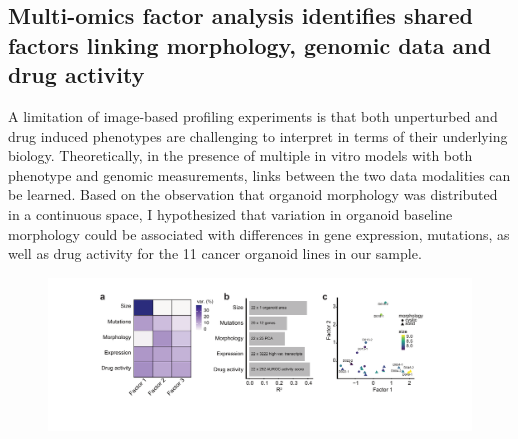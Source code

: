 \begin{flushleft}
\section{Multi-omics factor analysis identifies shared factors linking morphology, genomic data and drug activity}

A limitation of image-based profiling experiments is that both unperturbed and drug induced phenotypes are challenging to interpret in terms of their underlying biology. Theoretically, in the presence of multiple in vitro models with both phenotype and genomic measurements, links between the two data modalities can be learned. Based on the observation that organoid morphology was distributed in a continuous space, I hypothesized that variation in organoid baseline morphology could be associated with differences in gene expression, mutations, as well as drug activity for the 11 cancer organoid lines in our sample. 

\begin{figure}[h]
\centering
\includegraphics[width=\textwidth,
                height=\textheight,
                keepaspectratio]{figures/promise/pdf/fig_4_0.pdf}
\caption{}
\label{fig_240}
\end{figure}
\bigbreak


\end{flushleft}
